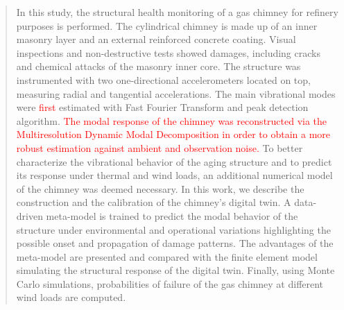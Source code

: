 \documentclass[runningheads]{llncs}
\begin{document}
\begin{abstract}
In this study, the structural health monitoring of a gas chimney for refinery purposes is performed. The cylindrical chimney is made up of an inner masonry layer and an external reinforced concrete coating. Visual inspections and non-destructive tests showed damages, including cracks and chemical attacks of the masonry inner core. The structure was instrumented with two one-directional accelerometers located on top, measuring radial and tangential accelerations. The main vibrational modes were \textcolor{red}{first} estimated with Fast Fourier Transform and peak detection algorithm. \textcolor{red}{The modal response of the chimney was reconstructed via the Multiresolution Dynamic Modal Decomposition in order to obtain a more robust estimation against ambient and observation noise.}
To better characterize the vibrational behavior of the aging structure and to predict its response under thermal and wind loads, an additional numerical model of the chimney was deemed necessary.
In this work, we describe the construction and the calibration of the chimney’s digital twin. A data-driven meta-model is trained to predict the modal behavior of the structure under environmental and operational variations highlighting the possible onset and propagation of damage patterns. The advantages of the meta-model are presented and compared with the finite element model simulating the structural response of the digital twin. Finally, using Monte Carlo simulations, probabilities of failure of the gas chimney at different wind loads are computed.

\end{abstract}
%
%
%
\end{document}
